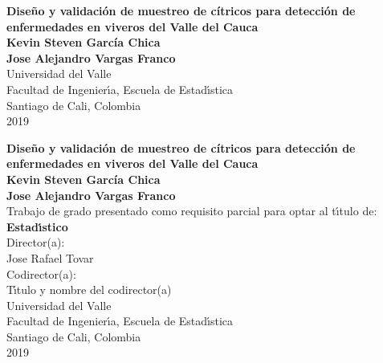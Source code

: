 
\begin{center}
\begin{figure}
\centering
{}
\end{figure}

\thispagestyle{empty}
\vspace*{2.0cm}

\textbf{\huge Dise\~{n}o y validaci\'{o}n de muestreo de c\'{i}tricos para detecci\'{o}n de enfermedades en viveros del Valle del Cauca}\\[5.0cm]

\Large\textbf{Kevin Steven Garc\'{i}a Chica}\\ 
\Large\textbf{Jose Alejandro Vargas Franco}\\[4.0cm]
\small Universidad del Valle\\
Facultad de Ingenier\'{\i}a, Escuela de Estad\'{\i}stica\\
Santiago de Cali, Colombia\\
2019\\
\end{center}

\newpage{\pagestyle{empty}\cleardoublepage}

\newpage

\begin{center}
\thispagestyle{empty}
\vspace*{0cm}

\textbf{\huge Dise\~{n}o y validaci\'{o}n de muestreo de c\'{i}tricos para detecci\'{o}n de enfermedades en viveros del Valle del Cauca}\\[3cm]

\Large\textbf{Kevin Steven Garc\'{i}a Chica}\\ 
\Large\textbf{Jose Alejandro Vargas Franco}\\[3.0cm]
\small Trabajo de grado presentado como requisito parcial para optar al t\'{\i}tulo de:\\
\textbf{Estad\'{\i}stico}\\[2.5cm]
Director(a):\\
Jose Rafael Tovar\\
Codirector(a):\\
T\'{\i}tulo y nombre del codirector(a)\\[3.5cm]
Universidad del Valle\\
Facultad de Ingenier\'{\i}a, Escuela de Estad\'{\i}stica\\
Santiago de Cali, Colombia\\
2019\\
\end{center}

